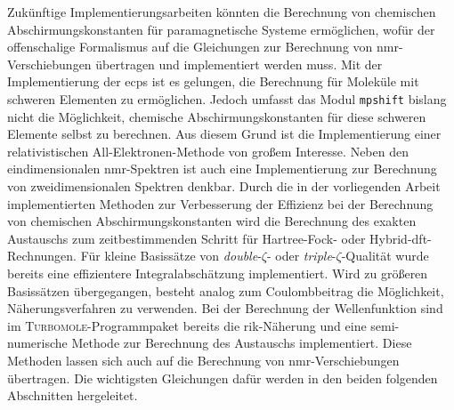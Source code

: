 Zukünftige Implementierungsarbeiten könnten die Berechnung von chemischen Abschirmungskonstanten für paramagnetische Systeme ermöglichen, wofür der offenschalige Formalismus auf die Gleichungen zur Berechnung von \ac{nmr}-Verschiebungen übertragen und implementiert werden muss. Mit der Implementierung der \acp{ecp} ist es gelungen, die Berechnung für Moleküle mit schweren Elementen zu ermöglichen. Jedoch umfasst das Modul \texttt{mpshift} bislang nicht die Möglichkeit, chemische Abschirmungskonstanten für diese schweren Elemente selbst zu berechnen. Aus diesem Grund ist die Implementierung einer relativistischen All-Elektronen-Methode von großem Interesse. Neben den eindimensionalen \ac{nmr}-Spektren ist auch eine Implementierung zur Berechnung von zweidimensionalen Spektren denkbar.  
Durch die in der vorliegenden Arbeit implementierten Methoden zur Verbesserung der Effizienz bei der Berechnung von chemischen Abschirmungskonstanten wird die Berechnung des exakten Austauschs zum zeitbestimmenden Schritt für Hartree-Fock- oder Hybrid-\ac{dft}-Rechnungen. Für kleine Basissätze von \textit{double}-$\zeta$- oder \textit{triple}-$\zeta$-Qualität wurde bereits eine effizientere Integralabschätzung implementiert. Wird zu größeren Basissätzen übergegangen, besteht analog zum Coulombbeitrag die Möglichkeit, Näherungsverfahren zu verwenden. Bei der Berechnung der Wellenfunktion sind im \textsc{Turbomole}-Programmpaket bereits die \ac{rik}-Näherung\supercite{weigend2002fully} und eine semi-numerische Methode\supercite{plessow2012seminumerical} zur Berechnung des Austauschs implementiert. Diese Methoden lassen sich auch auf die Berechnung von \ac{nmr}-Verschiebungen übertragen. Die wichtigsten Gleichungen dafür werden in den beiden folgenden Abschnitten hergeleitet. 

